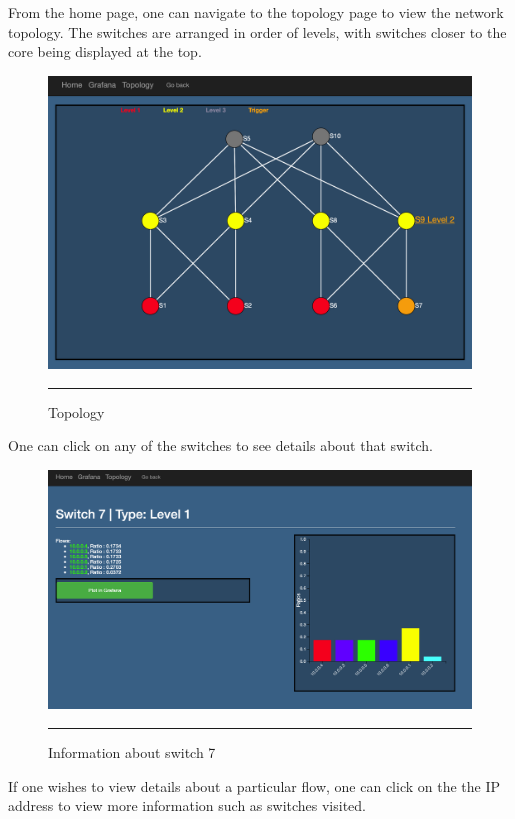 From the home page, one can navigate to the topology page to view the network topology.
The switches are arranged in order of levels, with switches closer to the core being displayed at the top.
\begin{figure}[htbp]
	\centering
		\includegraphics[width=0.85\columnwidth]{Figures/topo.png}
		\rule{35em}{0.5pt}
	\caption[Topology]{Topology}
	\label{fig:topo}
\end{figure}

One can click on any of the switches to see details about that switch.
\begin{figure}[htbp]
	\centering
		\includegraphics[width=0.85\columnwidth]{Figures/switch.png}
		\rule{35em}{0.5pt}
	\caption[Switch Information]{Information about switch 7}
	\label{fig:switch}
\end{figure}

\newpage

If one wishes to view details about a particular flow, one can click on the
the IP address to view more information such as switches visited.


